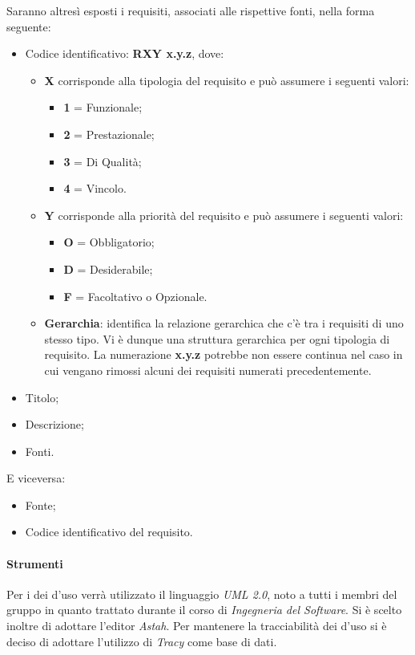 			Saranno altresì esposti i requisiti, associati alle rispettive fonti, nella forma seguente:
				\begin{itemize}
				\item Codice identificativo: \textbf{R{X}{Y} x.y.z}, dove:
				      \begin{itemize}
						\item \textbf{X} corrisponde alla tipologia del requisito e può assumere i seguenti valori:
							\begin{itemize}
								\item \textbf{1} = Funzionale;
								\item \textbf{2} = Prestazionale;
								\item \textbf{3} = Di Qualità;
								\item \textbf{4} = Vincolo.
							\end{itemize}
						\item \textbf{Y} corrisponde alla priorità del requisito e può assumere i seguenti valori:
							\begin{itemize}
								\item \textbf{O} = Obbligatorio;
								\item \textbf{D} = Desiderabile;
								\item \textbf{F} = Facoltativo o Opzionale.
							\end{itemize}
						\item \textbf{Gerarchia}: identifica la relazione gerarchica che c’è tra i requisiti di uno stesso
						tipo. Vi è dunque una struttura gerarchica per ogni tipologia di requisito.
						La numerazione \textbf{x.y.z} potrebbe non essere continua nel caso in cui vengano
						rimossi alcuni dei requisiti numerati precedentemente.
				      \end{itemize}
				\item Titolo;
				\item Descrizione;
                \item Fonti.
				\end{itemize}
			E viceversa:
				\begin{itemize}
				\item Fonte;
				\item Codice identificativo del requisito.
				\end{itemize}
			\paragraph*{Strumenti}
				Per i  dei  d'uso verrà utilizzato il linguaggio \textit{UML 2.0},
				noto a tutti i membri del gruppo in quanto trattato durante il corso
				di \textit{Ingegneria del Software}.
				Si \`e scelto inoltre di adottare l'editor  \textit{Astah}.   %
                                Per mantenere la tracciabilità dei  d'uso si è deciso di adottare l'utilizzo di \textit{Tracy} come base di dati.
			
